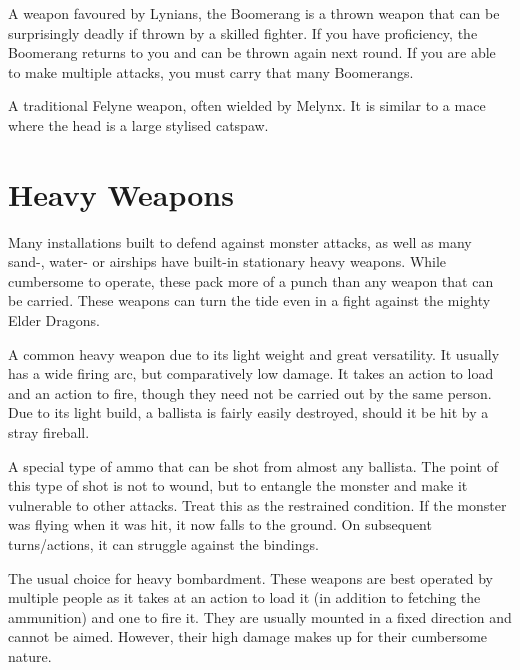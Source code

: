 A weapon favoured by Lynians, the Boomerang is a thrown weapon that can be surprisingly deadly if thrown by a skilled fighter. If you have proficiency, the Boomerang returns to you and can be thrown again next round. If you are able to make multiple attacks, you must carry that many Boomerangs.

A traditional Felyne weapon, often wielded by Melynx. It is similar to a mace where the head is a large stylised catspaw.

\section{Heavy Weapons}

Many installations built to defend against monster attacks, as well as many sand-, water- or airships have built-in stationary heavy weapons. While cumbersome to operate, these pack more of a punch than any weapon that can be carried. These weapons can turn the tide even in a fight against the mighty Elder Dragons.

A common heavy weapon due to its light weight and great versatility. It usually has a wide firing arc, but comparatively low damage. It takes an action to load and an action to fire, though they need not be carried out by the same person. Due to its light build, a ballista is fairly easily destroyed, should it be hit by a stray fireball.

A special type of ammo that can be shot from almost any ballista. The point of this type of shot is not to wound, but to entangle the monster and make it vulnerable to other attacks. Treat this as the restrained condition. If the monster was flying when it was hit, it now falls to the ground. On subsequent turns/actions, it can struggle against the bindings.

The usual choice for heavy bombardment. These weapons are best operated by multiple people as it takes at an action to load it (in addition to fetching the ammunition) and one to fire it. They are usually mounted in a fixed direction and cannot be aimed. However, their high damage makes up for their cumbersome nature.

